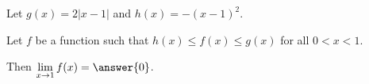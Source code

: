 \documentclass{ximera}
\author{Nela Lakos \and Kyle Parsons}
\begin{document}
\begin{exercise}

Let $g(x) = 2\left|x-1\right|$ and $h(x) = -(x-1)^2$.



Let $f$ be a function such that $h(x) \leq f(x) \leq g(x)$ for all $0 < x < 1$.

Then $\displaystyle \lim_{x\to1}f(x) = \answer{0}$.

\end{exercise}
\end{document}
